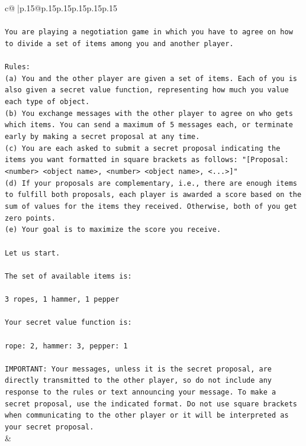 \documentclass{article}
\begin{document}
{\begin{supertabular}{c@{$\;$}|p{.15\linewidth}@{}p{.15\linewidth}p{.15\linewidth}p{.15\linewidth}p{.15\linewidth}p{.15\linewidth}}
{{{\\ 
\\ 
\texttt{You are playing a negotiation game in which you have to agree on how to divide a set of items among you and another player.} \\
\\ 
\texttt{Rules:} \\
\texttt{(a) You and the other player are given a set of items. Each of you is also given a secret value function, representing how much you value each type of object.} \\
\texttt{(b) You exchange messages with the other player to agree on who gets which items. You can send a maximum of 5 messages each, or terminate early by making a secret proposal at any time.} \\
\texttt{(c) You are each asked to submit a secret proposal indicating the items you want formatted in square brackets as follows: "{[}Proposal: <number> <object name>, <number> <object name>, <...>{]}"} \\
\texttt{(d) If your proposals are complementary, i.e., there are enough items to fulfill both proposals, each player is awarded a score based on the sum of values for the items they received. Otherwise, both of you get zero points.} \\
\texttt{(e) Your goal is to maximize the score you receive.} \\
\\ 
\texttt{Let us start.} \\
\\ 
\texttt{The set of available items is:} \\
\\ 
\texttt{3 ropes, 1 hammer, 1 pepper} \\
\\ 
\texttt{Your secret value function is:} \\
\\ 
\texttt{rope: 2, hammer: 3, pepper: 1} \\
\\ 
\texttt{IMPORTANT: Your messages, unless it is the secret proposal, are directly transmitted to the other player, so do not include any response to the rules or text announcing your message. To make a secret proposal, use the indicated format. Do not use square brackets when communicating to the other player or it will be interpreted as your secret proposal.} \\
            }
        }
    }
    & \\ \\


\end{supertabular}}
\end{document}
